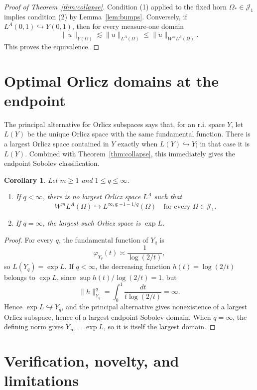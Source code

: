 \documentclass[11pt]{article}
\newtheorem{corollary}[theorem]{Corollary}
\begin{document}
\begin{proof}[Proof of Theorem~\ref{thm:collapse}]
Condition (1) applied to the fixed horn $\Omega_*\in\mathcal J_1$ implies
condition (2) by Lemma~\ref{lem:bumps}.  Conversely, if
$L^A(0,1)\hookrightarrow Y(0,1)$, then for every measure-one domain
\[
 \|u\|_{Y(\Omega)}\lesssim\|u\|_{L^A(\Omega)}
 \leq\|u\|_{W^mL^A(\Omega)}.
\]
This proves the equivalence.
\end{proof}

\section{Optimal Orlicz domains at the endpoint}

The principal alternative for Orlicz subspaces says that, for an r.i. space
$Y$, let $L(Y)$ be the unique Orlicz space with the same fundamental function.
There is a largest Orlicz space contained in $Y$ exactly when
$L(Y)\hookrightarrow Y$; in that case it is $L(Y)$.  Combined with
Theorem~\ref{thm:collapse}, this immediately gives the endpoint Sobolev
classification.

\begin{corollary}\label{cor:LZ}
Let $m\geq1$ and $1\leq q\leq\infty$.
\begin{enumerate}
\item If $q<\infty$, there is no largest Orlicz space $L^A$ such that
\[
 W^mL^A(\Omega)\hookrightarrow
 L^{\infty,q;-1-1/q}(\Omega)
 \quad\text{for every }\Omega\in\mathcal J_1.
\]
\item If $q=\infty$, the largest such Orlicz space is $\exp L$.
\end{enumerate}
\end{corollary}

\begin{proof}
For every $q$, the fundamental function of $Y_q$ is
\[
 \varphi_{Y_q}(t)\asymp\frac1{\log(2/t)},
\]
so $L(Y_q)=\exp L$.  If $q<\infty$, the decreasing function
$h(t)=\log(2/t)$ belongs to $\exp L$, since
$\sup h(t)/\log(2/t)=1$, but
\[
 \|h\|_{Y_q}^q
 =\int_0^1\frac{dt}{t\log(2/t)}=\infty.
\]
Hence $\exp L\not\hookrightarrow Y_q$, and the principal alternative gives
nonexistence of a largest Orlicz subspace, hence of a largest endpoint
Sobolev domain.  When $q=\infty$, the defining norm gives
$Y_\infty=\exp L$, so it is itself the largest domain.
\end{proof}

\section{Verification, novelty, and limitations}
\end{document}
